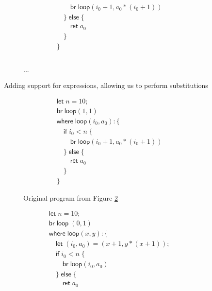 \documentclass[acmsmall,screen,review]{acmart}
\newcommand{\ms}[1]{\ensuremath{\mathsf{#1}}}
\begin{document}
\begin{figure}
\begin{subfigure}[t]{.35\textwidth}
\begin{align*}
      & \qquad \ms{br}\;\ms{loop}(i_0 + 1, a_0 * (i_0 + 1)) \\
      & \quad \}\;\ms{else}\;\{ \\
      & \qquad \ms{ret}\;a_0 \\
      & \quad \} \\
      & \} \\ \\
    \end{align*}
    \caption{...}
    \label{fig:fully-substituted-fact}
  \end{subfigure}
  \caption{Adding support for expressions, allowing us to perform substitutions}
  \Description{}
\end{figure}

\begin{figure}
  \begin{minipage}{.5\textwidth}
    \begin{subfigure}{\textwidth}
      \begin{align*}
        & \ms{let}\;n = 10; \\
        & \ms{br}\;\ms{loop}(1, 1) \\
        & \ms{where}\;\ms{loop}(i_0, a_0): \{\\
        & \quad \ms{if}\;i_0 < n\;\{ \\
        & \qquad \ms{br}\;\ms{loop}(i_0 + 1, a_0 * (i_0 + 1)) \\
        & \quad \}\;\ms{else}\;\{ \\
        & \qquad \ms{ret}\;a_0 \\
        & \quad \} \\
        & \}
      \end{align*}
      \caption{Original program from Figure \ref{fig:fully-substituted-fact}}
    \end{subfigure}
    \begin{subfigure}{\textwidth}
      \begin{align*}
        & \ms{let}\;n = 10; \\
        & \ms{br}\;\ms{loop}\;(0, 1) \\
        & \ms{where}\;\ms{loop}(x, y): \{\\
        & \quad \ms{let}\;(i_0, a_0) = (x + 1, y * (x + 1)); \\
        & \quad \ms{if}\;i_0 < n\;\{ \\
        & \qquad \ms{br}\;\ms{loop}(i_0, a_0) \\
        & \quad \}\;\ms{else}\;\{ \\
        & \qquad \ms{ret}\;a_0 \\

\end{align*}
\end{subfigure}
\end{minipage}
\end{figure}
\end{document}
